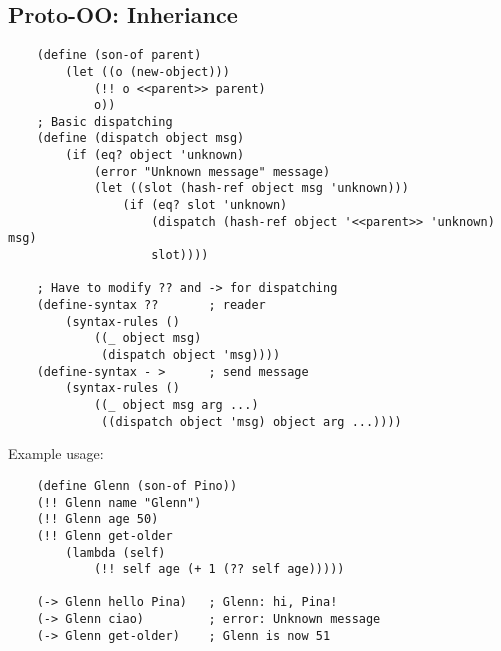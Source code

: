 \subsection{Proto-OO: Inheriance}
\begin{lstlisting}
    (define (son-of parent)
        (let ((o (new-object)))
            (!! o <<parent>> parent)
            o))
    ; Basic dispatching
    (define (dispatch object msg)
        (if (eq? object 'unknown)
            (error "Unknown message" message)
            (let ((slot (hash-ref object msg 'unknown)))
                (if (eq? slot 'unknown)
                    (dispatch (hash-ref object '<<parent>> 'unknown) msg)
                    slot))))

    ; Have to modify ?? and -> for dispatching
    (define-syntax ??       ; reader
        (syntax-rules ()
            ((_ object msg)
             (dispatch object 'msg))))
    (define-syntax - >      ; send message
        (syntax-rules ()
            ((_ object msg arg ...)
             ((dispatch object 'msg) object arg ...))))
\end{lstlisting}
Example usage:
\begin{lstlisting}
    (define Glenn (son-of Pino))
    (!! Glenn name "Glenn")
    (!! Glenn age 50)
    (!! Glenn get-older
        (lambda (self)
            (!! self age (+ 1 (?? self age)))))
    
    (-> Glenn hello Pina)   ; Glenn: hi, Pina!
    (-> Glenn ciao)         ; error: Unknown message
    (-> Glenn get-older)    ; Glenn is now 51
\end{lstlisting}